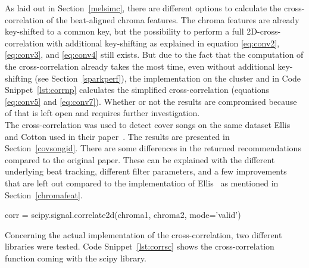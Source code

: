 As laid out in Section~\ref{melsimc}, there are different options to calculate the cross-correlation of the beat-aligned chroma features. The chroma features are already key-shifted to a common key, but the possibility to perform a full 2D-cross-correlation with additional key-shifting as explained in equation \eqref{eq:conv2}, \eqref{eq:conv3}, and \eqref{eq:conv4} still exists. But due to the fact that the computation of the cross-correlation already takes the most time, even without additional key-shifting (see Section~\ref{sparkperf}), the implementation on the cluster and in Code Snippet~\ref{lst:corrnp} calculates the simplified cross-correlation (equations \eqref{eq:conv5} and \eqref{eq:conv7}). Whether or not the results are compromised because of that is left open and requires further investigation.\\
\noindent The cross-correlation was used to detect cover songs on the same dataset Ellis and Cotton used in their paper~\cite{cover802}. The results are presented in Section~\ref{covsongid}. There are some differences in the returned recommendations compared to the original paper. These can be explained with the different underlying beat tracking, different filter parameters, and a few improvements that are left out compared to the implementation of Ellis~\cite{cover802} as mentioned in Section~\ref{chromafeat}.\\

\begin{pythonCode}[frame=single,label={lst:corrsc},caption={Cross-correlation scipy},captionpos=b]
corr = scipy.signal.correlate2d(chroma1, chroma2, mode='valid')
\end{pythonCode}

\noindent Concerning the actual implementation of the cross-correlation, two different libraries were tested. Code Snippet~\ref{lst:corrsc} shows the cross-correlation function coming with the scipy library.


